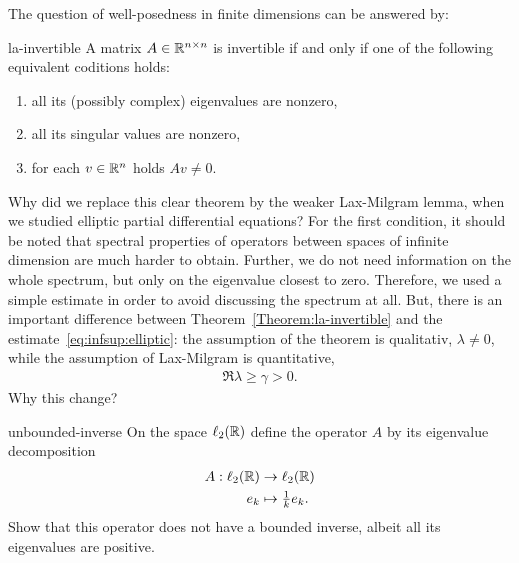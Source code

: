 The question of well-posedness in finite dimensions can be answered by:

\begin{Theorem}{la-invertible}
  A matrix $A\in\mathbb R^{n\times n}$ is invertible if and only if one of
  the following equivalent coditions holds:
  \begin{enumerate}
  \item all its (possibly complex) eigenvalues are nonzero,
  \item all its singular values are nonzero,
  \item for each $v\in\mathbb R^n$ holds $Av\neq 0$.
  \end{enumerate}
\end{Theorem}

\begin{intro}
  Why did we replace this clear theorem by the weaker Lax-Milgram
  lemma, when we studied elliptic partial differential equations?  For
  the first condition, it should be noted that spectral properties of
  operators between spaces of infinite dimension are much harder to
  obtain. Further, we do not need information on the whole spectrum,
  but only on the eigenvalue closest to zero. Therefore, we used a
  simple estimate in order to avoid discussing the spectrum at
  all. But, there is an important difference between
  Theorem~\ref{Theorem:la-invertible} and the
  estimate~\eqref{eq:infsup:elliptic}: the assumption of the theorem
  is qualitativ, $\lambda \neq 0$, while the assumption of Lax-Milgram
  is quantitative,
  \begin{gather*}
    \Re\lambda \ge \gamma> 0.
  \end{gather*}
  Why this change?
\end{intro}

\begin{Problem}{unbounded-inverse}
  On the space $\ell_2(\mathbb R)$ define the operator $A$ by its eigenvalue
  decomposition
  \begin{align*}
    A: \ell_2(\mathbb R) &\to \ell_2(\mathbb R)\\
    e_k & \mapsto \tfrac1k e_k.
  \end{align*}
  Show that this operator does not have a bounded inverse, albeit all
  its eigenvalues are positive.
\end{Problem}

